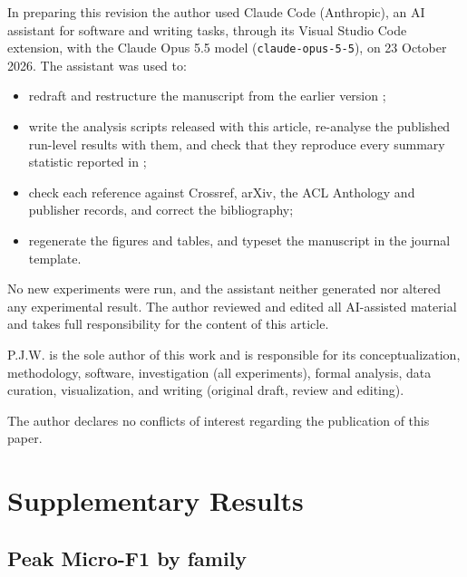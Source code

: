 \documentclass{ijis}
\begin{document}
In preparing this revision the author used Claude Code (Anthropic), an AI assistant for software and writing tasks, through its Visual Studio Code extension, with the Claude Opus 5.5 model (\texttt{claude-opus-5-5}), on 23 October 2026. The assistant was used to:
\begin{itemize}
\item redraft and restructure the manuscript from the earlier version \cite{worth2025layercake};
\item write the analysis scripts released with this article, re-analyse the published run-level results with them, and check that they reproduce every summary statistic reported in \cite{worth2025layercake};
\item check each reference against Crossref, arXiv, the ACL Anthology and publisher records, and correct the bibliography;
\item regenerate the figures and tables, and typeset the manuscript in the journal template.
\end{itemize}
No new experiments were run, and the assistant neither generated nor altered any experimental result. The author reviewed and edited all AI-assisted material and takes full responsibility for the content of this article.

P.J.W. is the sole author of this work and is responsible for its conceptualization, methodology, software, investigation (all experiments), formal analysis, data curation, visualization, and writing (original draft, review and editing).

The author declares no conflicts of interest regarding the publication of this paper.




\appendix
\renewcommand{\thesection}{\Alph{section}}
\setcounter{table}{0}
\renewcommand{\thetable}{A\arabic{table}}
\section{Supplementary Results}

\subsection{Peak Micro-F1 by family}\label{app:micro}
\end{document}

